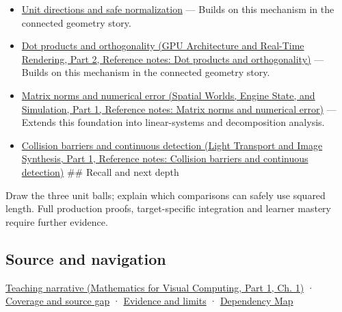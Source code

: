\hypertarget{appendix-49933872bb51-used-by}{}

\begin{itemize}
\item
  \hyperref[appendix-f744e41b95b4]{Unit directions and safe normalization} --- Builds on this mechanism in the connected geometry story.
\item
  \href{../06-GPU-Architecture-and-Real-Time-Rendering-P02/main.pdf\#nameddest=appendix-8bc4e8fc547c}{Dot products and orthogonality (GPU Architecture and Real-Time Rendering, Part 2, Reference notes: Dot products and orthogonality)} --- Builds on this mechanism in the connected geometry story.
\item
  \href{../05-Spatial-Worlds-Engine-State-and-Simulation-P01/main.pdf\#nameddest=appendix-f8657bac66e5}{Matrix norms and numerical error (Spatial Worlds, Engine State, and Simulation, Part 1, Reference notes: Matrix norms and numerical error)} --- Extends this foundation into linear-systems and decomposition analysis.
\item
  \href{../04-Light-Transport-and-Image-Synthesis-P01/main.pdf\#nameddest=appendix-a9ba01fa72a6}{Collision barriers and continuous detection (Light Transport and Image Synthesis, Part 1, Reference notes: Collision barriers and continuous detection)} \#\# Recall and next depth
\end{itemize}

Draw the three unit balls; explain which comparisons can safely use squared length. Full production proofs, target-specific integration and learner mastery require further evidence.

\subsection{Source and navigation}\label{appendix-49933872bb51-source-and-navigation}

\hypertarget{appendix-49933872bb51-source-and-navigation}{}

\href{../02-Mathematics-for-Visual-Computing-P01/main.pdf\#nameddest=01-foundations-i-ch017-a-ruler-needs-more-than-coordinate-components}{Teaching narrative (Mathematics for Visual Computing, Part 1, Ch. 1)} · \hyperref[appendix-fd090d982a15-phase-6---parts-501-600]{Coverage and source gap} · \hyperref[appendix-a103e7846d21-phase-6---source-analysis-and-verification]{Evidence and limits} · \hyperref[appendix-4ad47bdd269a]{Dependency Map}
